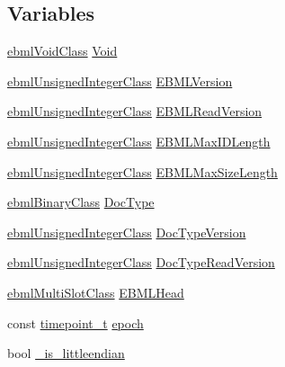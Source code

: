 \subsection*{Variables}
\begin{DoxyCompactItemize}
\item 
\mbox{\hyperlink{classebml_1_1ebmlVoidClass}{ebml\+Void\+Class}} \mbox{\hyperlink{namespaceebml_afbfd509d1cb71e416a07253746e886e9}{Void}}
\item 
\mbox{\hyperlink{namespaceebml_a506b246c5594e5d0322c3c05e9820fd2}{ebml\+Unsigned\+Integer\+Class}} \mbox{\hyperlink{namespaceebml_ab043f0427daa3a4eb36615002a603c2f}{E\+B\+M\+L\+Version}}
\item 
\mbox{\hyperlink{namespaceebml_a506b246c5594e5d0322c3c05e9820fd2}{ebml\+Unsigned\+Integer\+Class}} \mbox{\hyperlink{namespaceebml_ae2a831962d9fe406ade51a61f4d7f44f}{E\+B\+M\+L\+Read\+Version}}
\item 
\mbox{\hyperlink{namespaceebml_a506b246c5594e5d0322c3c05e9820fd2}{ebml\+Unsigned\+Integer\+Class}} \mbox{\hyperlink{namespaceebml_aa5391f5da29eee93d9bbb4faef121430}{E\+B\+M\+L\+Max\+I\+D\+Length}}
\item 
\mbox{\hyperlink{namespaceebml_a506b246c5594e5d0322c3c05e9820fd2}{ebml\+Unsigned\+Integer\+Class}} \mbox{\hyperlink{namespaceebml_a2f4a3ca0aa5867e5024d72b48328ee65}{E\+B\+M\+L\+Max\+Size\+Length}}
\item 
\mbox{\hyperlink{namespaceebml_a4fe139b904ac34f0e3036c9451b4b18b}{ebml\+Binary\+Class}} \mbox{\hyperlink{namespaceebml_ad196ce572692673a986be2bdabf9907b}{Doc\+Type}}
\item 
\mbox{\hyperlink{namespaceebml_a506b246c5594e5d0322c3c05e9820fd2}{ebml\+Unsigned\+Integer\+Class}} \mbox{\hyperlink{namespaceebml_a4bfea9b659c99c0f0d0dc51026f480ca}{Doc\+Type\+Version}}
\item 
\mbox{\hyperlink{namespaceebml_a506b246c5594e5d0322c3c05e9820fd2}{ebml\+Unsigned\+Integer\+Class}} \mbox{\hyperlink{namespaceebml_acd5324e76213e2721983c93bd909eeff}{Doc\+Type\+Read\+Version}}
\item 
\mbox{\hyperlink{classebml_1_1ebmlMultiSlotClass}{ebml\+Multi\+Slot\+Class}} \mbox{\hyperlink{namespaceebml_a969dbd2316937386e704f1aae53ed8b9}{E\+B\+M\+L\+Head}}
\item 
const \mbox{\hyperlink{namespaceebml_a7e667ec3fe8b51fb5b8f9690734d8638}{timepoint\+\_\+t}} \mbox{\hyperlink{namespaceebml_a137fb22cbfb98d4e7bd6367064078bee}{epoch}}
\item 
bool \mbox{\hyperlink{namespaceebml_a3dca826d4a08dfedbd01e9aa1c09bc1e}{\+\_\+is\+\_\+littleendian}}
\end{DoxyCompactItemize}


